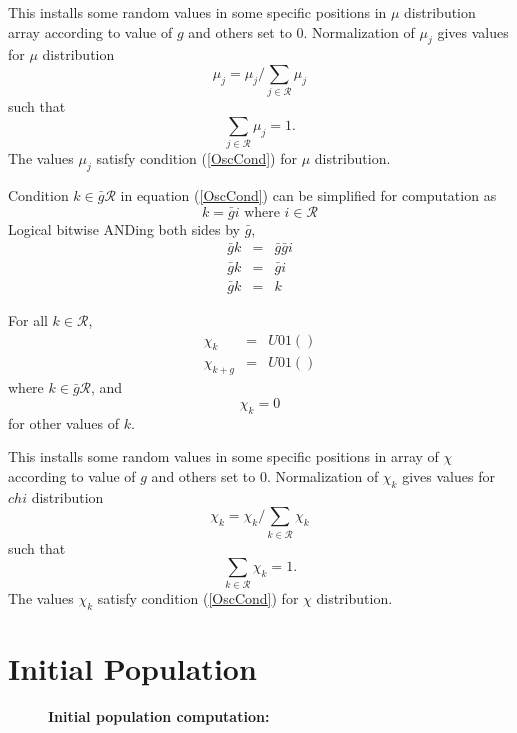 This installs some random values in some specific positions in $\mu$ distribution array according to value of $g$ and others set to $0$. 
Normalization of $\mu_j$ gives values for $\mu$ distribution
\[
\mu_j = \mu_j / \sum \limits_{j \in \mathcal{R} } \mu_j
\]
such that 
\[
\sum \limits_{j \in \mathcal{R} } \mu_j = 1.
\]
The values $\mu_j$ satisfy condition (\ref{OscCond}) for $\mu$ distribution.


Condition $k \in \bar{g} \mathcal{R}$ in equation (\ref{OscCond}) can be simplified for computation as
\[
k = \bar{g} i  \text{ where $i \in \mathcal{R}$}
\]
Logical bitwise ANDing both sides by $\bar{g}$,
\begin{eqnarray*}
\bar{g} k & = & \bar{g} \bar{g} i \\
\bar{g} k & = & \bar{g} i \\
\bar{g} k & = & k 
\end{eqnarray*}

For all $k \in \mathcal{R}$,
\begin{eqnarray*}
\chi_k & = & U01() \\
\chi_{k+g} & = & U01() 
\end{eqnarray*}
where $k \in \bar{g} \mathcal{R}$, and
\[
\chi_k = 0
\]
for other values of $k$. \newline

This installs some random values in some specific positions in array of $\chi$ according to value of $g$ and others set to $0$. Normalization of $\chi_k$ gives values for $chi$ distribution 
\[
\chi_k = \chi_k/\sum\limits_{k \in \mathcal{R}} \chi_k
\]
such that 
\[
\sum\limits_{k \in \mathcal{R}} \chi_k = 1.
\]
The values $\chi_k$ satisfy condition (\ref{OscCond}) for $\chi$ distribution.

\section{Initial Population}
\label{InitPopOsc}

\begin{figure}[H]
\begin{center}
\hspace{5pt}
\caption{\textbf{Initial population computation:} }
\label{initalpop}
\end{center}
\end{figure}


